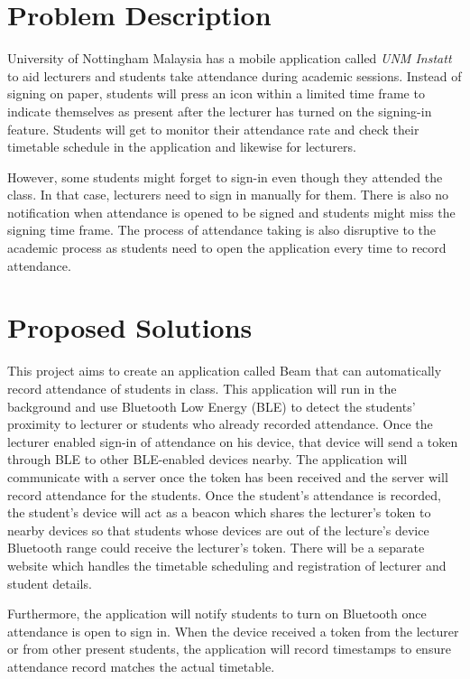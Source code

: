 \documentclass[../report.tex]{subfiles}
\begin{document}
\section{Problem Description}
University of Nottingham Malaysia has a mobile application called \textit{UNM Instatt} to aid lecturers and students take attendance during academic sessions. Instead of signing on paper, students will press an icon within a limited time frame to indicate themselves as present after the lecturer has turned on the signing-in feature. Students will get to monitor their attendance rate and check their timetable schedule in the application and likewise for lecturers. 

However, some students might forget to sign-in even though they attended the class. In that case, lecturers need to sign in manually for them. There is also no notification when attendance is opened to be signed and students might miss the signing time frame. The process of attendance taking is also disruptive to the academic process as students need to open the application every time to record attendance.

\section{Proposed Solutions}
This project aims to create an application called Beam that can automatically record attendance of students in class. This application will run in the background and use Bluetooth Low Energy (BLE) to detect the students’ proximity to lecturer or students who already recorded attendance. Once the lecturer enabled sign-in of attendance on his device, that device will send a token through BLE to other BLE-enabled devices nearby. The application will communicate with a server once the token has been received and the server will record attendance for the students. Once the student’s attendance is recorded, the student’s device will act as a beacon which shares the lecturer’s token to nearby devices so that students whose devices are out of the lecture’s device Bluetooth range could receive the lecturer’s token.  There will be a separate website which handles the timetable scheduling and registration of lecturer and student details.  

Furthermore, the application will notify students to turn on Bluetooth once attendance is open to sign in. When the device received a token from the lecturer or from other present students, the application will record timestamps to ensure attendance record matches the actual timetable.
\end{document}
